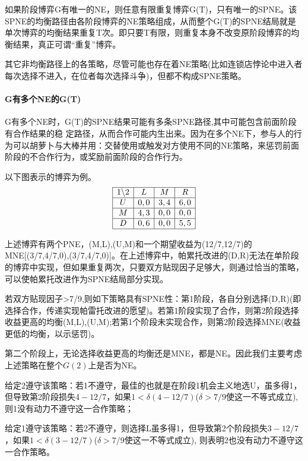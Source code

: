 \documentclass[UTF8,12pt]{ctexart}
\numberwithin{equation}{section} %
\numberwithin{figure}{section}
\numberwithin{table}{section}
\begin{document}
	如果阶段博弈G有唯一的NE，则任意有限重复博弈G(T)，只有唯一的SPNE。该SPNE的均衡路径由各阶段博弈的NE策略组成，从而整个G(T)的SPNE结局就是单次博弈的均衡结果重复T次。即只要T有限，则重复本身不改变原阶段博弈的均衡结果，真正可谓“重复”博弈。
	
	其它非均衡路径上的各策略，尽管可能也存在着NE策略(比如连锁店悖论中进入者每次选择不进入，在位者每次选择斗争)，但都不构成SPNE策略。
	
	\paragraph{G有多个NE的G(T)}
	G有多个NE时，G(T)的SPNE结果可能有多条SPNE路径,其中可能包含前面阶段有合作结果的稳
	定路径，从而合作可能内生出来。因为在多个NE下，参与人的行为可以胡萝卜与大棒并用：交替使用或触发对方使用不同的NE策略，来惩罚前面阶段的不合作行为，或奖励前面阶段的合作行为。
	
	以下图表示的博弈为例。
	\begin{equation}
		\begin{array}{|c|c|c|c|}
			\hline
			1 \backslash 2 & L & M & R \\
			\hline
			U & 0,0 & 3,4 & 6,0 \\
			\hline
			M & 4,3 & 0,0 & 0,0 \\
			\hline
			D & 0,6 & 0,0 & 5,5 \\
			\hline
		\end{array}
	\end{equation}
	
	上述博弈有两个PNE，(M,L),(U,M)和一个期望收益为(12/7,12/7)的MNE[(3/7,4/7,0),(3/7,4/7,0)]。在上述博弈中，帕累托改进的(D,R)无法在单阶段的博弈中实现，但如果重复两次，只要双方贴现因子足够大，则通过恰当的策略，可以使帕累托改进作为SPNE结局部分实现。
	
	若双方贴现因子>7/9,则如下策略具有SPNE性：第1阶段，各自分别选择(D,R)(即选择合作，传递实现帕雷托改进的愿望)。若第1阶段实现了合作，则第2阶段选择收益更高的均衡(M,L),(U,M);若第1个阶段未实现合作，则第2阶段选择MNE(收益更低的均衡，以示惩罚)。
	
	第二个阶段上，无论选择收益更高的均衡还是MNE，都是NE。因此我们主要考虑上述策略在整个$G(2)$上是否为NE。
	
	给定2遵守该策略：若1不遵守，最佳的也就是在阶段1机会主义地选U，虽多得1，但导致第2阶段损失$4-12/7$，如果$1<\delta(4-12/7)$($\delta>7/9$使这一不等式成立),则1没有动力不遵守这一合作策略；
	
	给定1遵守该策略：若2不遵守，则选择L虽多得1，但导致第2个阶段损失$3-12/7$，如果$1<\delta(3-12/7)$($\delta>7/9$使这一不等式成立), 则表明2也没有动力不遵守这一合作策略。
	
\end{document}
